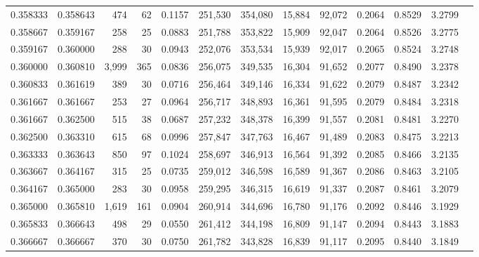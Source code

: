 \begin{tabular}{rrrrrrrrrrrrr}
0.358333 & 0.358643 &   474 &  62 &                                     0.1157 & 251,530 & 354,080 &  15,884 &  92,072 & 0.2064 & 0.8529 & 3.2799 \\
0.358667 & 0.359167 &   258 &  25 &                                     0.0883 & 251,788 & 353,822 &  15,909 &  92,047 & 0.2064 & 0.8526 & 3.2775 \\
0.359167 & 0.360000 &   288 &  30 &                                     0.0943 & 252,076 & 353,534 &  15,939 &  92,017 & 0.2065 & 0.8524 & 3.2748 \\
0.360000 & 0.360810 & 3,999 & 365 &                                     0.0836 & 256,075 & 349,535 &  16,304 &  91,652 & 0.2077 & 0.8490 & 3.2378 \\
0.360833 & 0.361619 &   389 &  30 &                                     0.0716 & 256,464 & 349,146 &  16,334 &  91,622 & 0.2079 & 0.8487 & 3.2342 \\
0.361667 & 0.361667 &   253 &  27 &                                     0.0964 & 256,717 & 348,893 &  16,361 &  91,595 & 0.2079 & 0.8484 & 3.2318 \\
0.361667 & 0.362500 &   515 &  38 &                                     0.0687 & 257,232 & 348,378 &  16,399 &  91,557 & 0.2081 & 0.8481 & 3.2270 \\
0.362500 & 0.363310 &   615 &  68 &                                     0.0996 & 257,847 & 347,763 &  16,467 &  91,489 & 0.2083 & 0.8475 & 3.2213 \\
0.363333 & 0.363643 &   850 &  97 &                                     0.1024 & 258,697 & 346,913 &  16,564 &  91,392 & 0.2085 & 0.8466 & 3.2135 \\
0.363667 & 0.364167 &   315 &  25 &                                     0.0735 & 259,012 & 346,598 &  16,589 &  91,367 & 0.2086 & 0.8463 & 3.2105 \\
0.364167 & 0.365000 &   283 &  30 &                                     0.0958 & 259,295 & 346,315 &  16,619 &  91,337 & 0.2087 & 0.8461 & 3.2079 \\
0.365000 & 0.365810 & 1,619 & 161 &                                     0.0904 & 260,914 & 344,696 &  16,780 &  91,176 & 0.2092 & 0.8446 & 3.1929 \\
0.365833 & 0.366643 &   498 &  29 &                                     0.0550 & 261,412 & 344,198 &  16,809 &  91,147 & 0.2094 & 0.8443 & 3.1883 \\
0.366667 & 0.366667 &   370 &  30 &                                     0.0750 & 261,782 & 343,828 &  16,839 &  91,117 & 0.2095 & 0.8440 & 3.1849 \\

\end{tabular}
